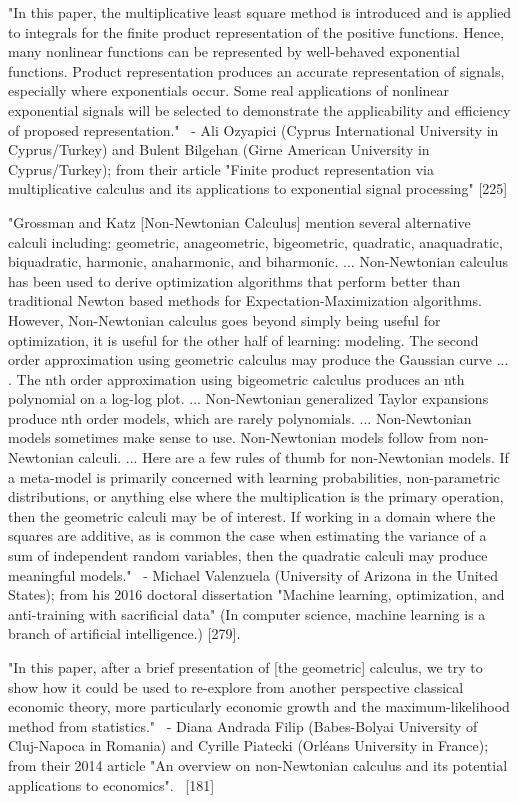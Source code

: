\documentclass[12pt]{article}
\begin{document}
"In this paper, the multiplicative least square method is introduced and is applied to integrals for the finite product representation of the positive functions. Hence, many nonlinear functions can be represented by well-behaved exponential functions. Product representation produces an accurate representation of signals, especially where exponentials occur. Some real applications of nonlinear exponential signals will be selected to demonstrate the applicability and efficiency of proposed representation."
 - Ali Ozyapici (Cyprus International University in Cyprus/Turkey) and Bulent Bilgehan (Girne American University in Cyprus/Turkey); from their article "Finite product representation via multiplicative calculus and its applications to exponential signal processing" [225]

"Grossman and Katz [Non-Newtonian Calculus] mention several alternative calculi including: geometric, anageometric, bigeometric, quadratic, anaquadratic, biquadratic, harmonic, anaharmonic, and biharmonic. ... Non-Newtonian calculus has been used to derive optimization algorithms that perform better than traditional Newton based methods for Expectation-Maximization algorithms. However, Non-Newtonian calculus goes beyond simply being useful for optimization, it is useful for the other half of learning: modeling. The second order approximation using geometric calculus may produce the Gaussian curve ... . The nth order approximation using bigeometric calculus produces an nth polynomial on a log-log plot. ... Non-Newtonian generalized Taylor expansions produce nth order models, which are rarely polynomials. ... Non-Newtonian models sometimes make sense to use. Non-Newtonian models follow from non- Newtonian calculi. ... Here are a few rules of thumb for non-Newtonian models. If a meta-model is primarily concerned with learning probabilities, non-parametric distributions, or anything else where the multiplication is the primary operation, then the geometric calculi may be of interest. If working in a domain where the squares are additive, as is common the case when estimating the variance of a sum of independent random variables, then the quadratic calculi may produce meaningful models."
 - Michael Valenzuela (University of Arizona in the United States); from his 2016 doctoral dissertation "Machine learning, optimization, and anti-training with sacrificial data" (In computer science, machine learning is a branch of artificial intelligence.) [279].

"In this paper, after a brief presentation of [the geometric] calculus, we try to show how it could be used to re-explore from another perspective classical economic theory, more particularly economic growth and the maximum-likelihood method from statistics."
 - Diana Andrada Filip (Babes-Bolyai University of Cluj-Napoca in Romania) and Cyrille Piatecki (Orléans University in France); from their 2014 article "An overview on non-Newtonian calculus and its potential applications to economics".  [181]
\end{document}
